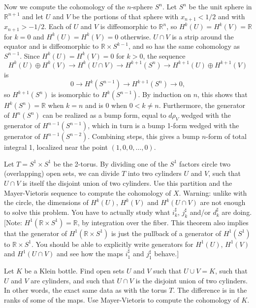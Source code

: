 \documentclass[12pt]{amsbook}
\newcommand{\R}{{\mathbb R}}
\theoremstyle{definition}
\begin{document}
 Now we compute the cohomology of the $n$-sphere $S^n$. 
 Let $S^n$ be the unit sphere in $\R^{n+1}$ and let $U$ and $V$ be the portions of that sphere with $x_{n+1} <1/2$
 and with $x_{n+1} > -1/2$. Each of $U$ and $V$ is diffeomorphic to $\R^n$, so $H^k(U)=H^k(V)=\R$ for $k=0$ and 
 $H^k(U)=H^k(V)=0$ otherwise. $U\cap V$ is a strip around the equator and is diffeomorphic to $\R \times S^{k-1}$,
 and so has the same cohomology as $S^{n-1}$.  Since $H^k(U)=H^k(V) =0$ for $k>0$, the sequence  
 $$  H^k(U)\oplus H^k(V) \to H^k(U\cap V) \to H^{k+1}(S^n) \to H^{k+1}(U) \oplus H^{k+1}(V) $$
 is 
 $$ 0 \to H^k(S^{n-1}) \to H^{k+1}(S^n) \to 0,$$
 so $H^{k+1}(S^n)$ is isomorphic to $H^k(S^{n-1})$.  By induction on $n$, this shows that $H^k(S^n)=\R$ when $k=n$ and
 is 0 when $0<k \ne n$. Furthermore, the generator of $H^n(S^n)$ can be realized as a bump form, equal to 
 $d \rho_V$ wedged with the generator of $H^{n-1}(S^{n-1})$, which in turn is a bump 1-form wedged with the 
 generator of $H^{n-1}(S^{n-2})$. Combining steps, this gives a bump $n$-form of total integral 1, localized near the point
 $(1,0,0,\ldots,0)$.    
 
 \smallskip
 
   Let $T = S^1 \times S^1$ be the 2-torus. By dividing one of the $S^1$ factors circle two (overlapping) 
 open sets, we can divide $T$ into two cylinders $U$ and $V$, such that $U\cap V$ is itself the disjoint union of two cylinders. 
 Use this partition and the Mayer-Vietoris sequence to compute the cohomology of $X$. Warning:  unlike with the circle, 
 the dimensions of $H^k(U)$, $H^k(V)$ and $H^k(U\cap V)$ are not enough to solve this problem. You have to actually 
 study what $i_k^\sharp$, $j_k^\sharp$ and/or $d_k^\sharp$ are doing. [Note:  $H^1(\R \times S^1)=\R$, by integration
 over the fiber. This theorem also implies that the generator of $H^1(\R \times S^1)$ is just the pullback of a generator of $H^1(S^1)$ to  $\R \times S^1$. You should be able to explicitly write generators for $H^1(U)$, $H^1(V)$ and $H^1(U\cap V)$
 and see how the maps $i_1^\sharp$ and $j_1^\sharp$ behave.]
 
 \smallskip
 
  Let $K$ be a Klein bottle. Find open sets $U$ and $V$ such that $U \cup V = K$, such that 
 $U$ and $V$ are cylinders, and such that $U \cap V$ is the disjoint union of two cylinders. In other words, the exact same
 data as with the torus $T$. The difference is in the ranks of some of the maps. Use Mayer-Vietoris to compute the cohomology
 of $K$. 
 
\end{document}
